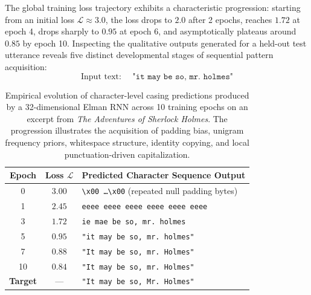 \documentclass[../../../main.tex]{subfiles}
\begin{document}
The global training loss trajectory exhibits a characteristic progression: starting from an initial loss $\mathcal{L} \approx 3.0$, the loss drops to $2.0$ after 2 epochs, reaches $1.72$ at epoch 4, drops sharply to $0.95$ at epoch 6, and asymptotically plateaus around $0.85$ by epoch 10. Inspecting the qualitative outputs generated for a held-out test utterance reveals five distinct developmental stages of sequential pattern acquisition:
\begin{equation}
\text{Input text: } \quad \texttt{"it may be so, mr. holmes"}
\end{equation}

\begin{table}[htbp]
\centering
\small
\begin{tabularx}{\textwidth}{c c X}
\toprule
\textbf{Epoch} & \textbf{Loss $\mathcal{L}$} & \textbf{Predicted Character Sequence Output} \\
\midrule
0 & $3.00$ & \texttt{\textbackslash x00 \dots \textbackslash x00} (repeated null padding bytes) \\
1 & $2.45$ & \texttt{eeee eeee eeee eeee eeee eeee} \\
3 & $1.72$ & \texttt{ie mae be so, mr. holmes} \\
5 & $0.95$ & \texttt{"it may be so, mr. holmes"} \\
7 & $0.88$ & \texttt{"It may be so, mr. Holmes"} \\
10 & $0.84$ & \texttt{"It may be so, mr. Holmes"} \\
\midrule
\textbf{Target} & --- & \texttt{"It may be so, Mr. Holmes"} \\
\bottomrule
\end{tabularx}
\caption{Empirical evolution of character-level casing predictions produced by a 32-dimensional Elman RNN across 10 training epochs on an excerpt from \textit{The Adventures of Sherlock Holmes}. The progression illustrates the acquisition of padding bias, unigram frequency priors, whitespace structure, identity copying, and local punctuation-driven capitalization.}
\label{tab:rnn_casing_progression}
\end{table}
\end{document}
